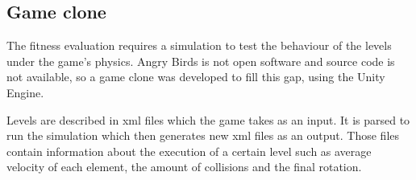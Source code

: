 \subsection{Game clone}

The fitness evaluation requires a simulation to test the behaviour of the levels under the game's physics. Angry Birds is not open software and source code is not available, so a game clone was developed to fill this gap, using the Unity Engine. 

Levels are described in xml files which the game takes as an input. It is parsed to run the simulation which then generates new xml files as an output. Those files contain information about the execution of a certain level such as average velocity of each element, the amount of collisions and the final rotation. 
